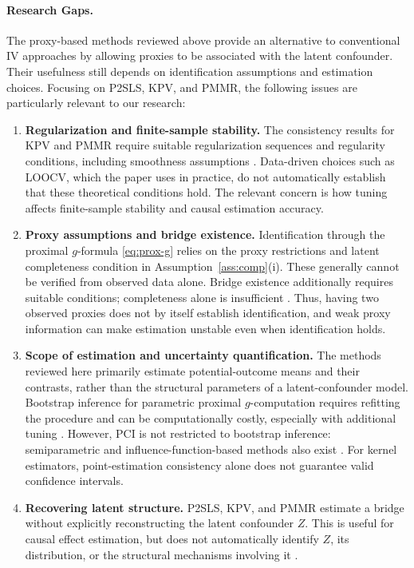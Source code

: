\documentclass[11pt,twoside]{article}
\begin{document}
\paragraph{Research Gaps.}
The proxy-based methods reviewed above provide an alternative to conventional IV approaches by allowing proxies to be associated with the latent confounder. Their usefulness still depends on identification assumptions and estimation choices. Focusing on P2SLS, KPV, and PMMR, the following issues are particularly relevant to our research:
\begin{enumerate}
    \item \textbf{Regularization and finite-sample stability.}
    The consistency results for KPV and PMMR require suitable regularization sequences and regularity conditions, including smoothness assumptions \cite{mastouri2021proximal}. Data-driven choices such as LOOCV, which the paper uses in practice, do not automatically establish that these theoretical conditions hold. The relevant concern is how tuning affects finite-sample stability and causal estimation accuracy.

    \item \textbf{Proxy assumptions and bridge existence.}
    Identification through the proximal $g$-formula \eqref{eq:prox-g} relies on the proxy restrictions and latent completeness condition in Assumption~\ref{ass:comp}(i). These generally cannot be verified from observed data alone. Bridge existence additionally requires suitable conditions; completeness alone is insufficient \cite{miao2018proxy,tchetgen2020introduction}. Thus, having two observed proxies does not by itself establish identification, and weak proxy information can make estimation unstable even when identification holds.

    \item \textbf{Scope of estimation and uncertainty quantification.}
    The methods reviewed here primarily estimate potential-outcome means and their contrasts, rather than the structural parameters of a latent-confounder model. Bootstrap inference for parametric proximal $g$-computation requires refitting the procedure and can be computationally costly, especially with additional tuning \cite{tchetgen2020introduction}. However, PCI is not restricted to bootstrap inference: semiparametric and influence-function-based methods also exist \cite{cui2024semiparametric}. For kernel estimators, point-estimation consistency alone does not guarantee valid confidence intervals.

    \item \textbf{Recovering latent structure.}
    P2SLS, KPV, and PMMR estimate a bridge without explicitly reconstructing the latent confounder $Z$. This is useful for causal effect estimation, but does not automatically identify $Z$, its distribution, or the structural mechanisms involving it \cite{miao2018proxy}. 
\end{enumerate}
\end{document}
